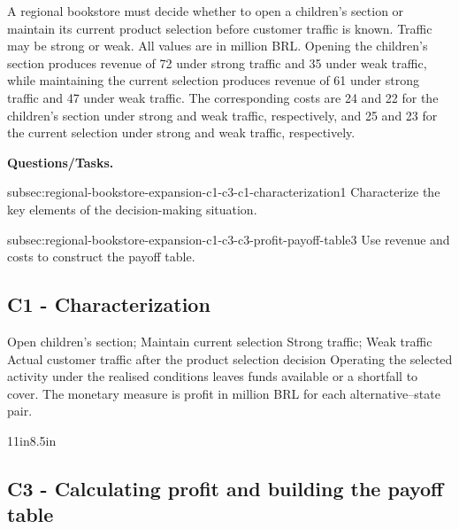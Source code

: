 	{
		A regional bookstore must decide whether to open a children's section or maintain its current product selection before customer traffic is known. Traffic may be strong or weak. All values are in million BRL. Opening the children's section produces revenue of 72 under strong traffic and 35 under weak traffic, while maintaining the current selection produces revenue of 61 under strong traffic and 47 under weak traffic. The corresponding costs are 24 and 22 for the children's section under strong and weak traffic, respectively, and 25 and 23 for the current selection under strong and weak traffic, respectively.
		
		\textbf{Questions/Tasks.}
		\begin{enumerate}
			\CriterionTask
			{subsec:regional-bookstore-expansion-c1-c3-c1-characterization}{1}
			{Characterize the key elements of the decision-making situation. }
			
			\CriterionTask
			{subsec:regional-bookstore-expansion-c1-c3-c3-profit-payoff-table}{3}
			{Use revenue and costs to construct the payoff table. }
		\end{enumerate}
		
		\label{subsec:regional-bookstore-expansion-c1-c3-c1-characterization}
		\subsection*{C1 - Characterization }
		
		\DecisionElementsTable
{Open children's section; Maintain current selection}
{Strong traffic; Weak traffic}
{Actual customer traffic after the product selection decision}
{Operating the selected activity under the realised conditions leaves funds available or a shortfall to cover. The monetary measure is profit in million BRL for each alternative--state pair.}

		
		\begin{CalculationLandscape}{11in}{8.5in}
		\label{subsec:regional-bookstore-expansion-c1-c3-c3-profit-payoff-table}
		\subsection*{C3 - Calculating profit and building the payoff table }
		

\end{CalculationLandscape}}
